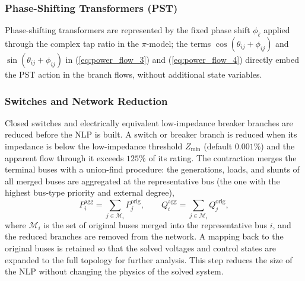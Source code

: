 \documentclass[letterpaper,journal]{IEEEtran}
\begin{document}
\subsubsection{Phase-Shifting Transformers (PST)}
Phase-shifting transformers are represented by the fixed phase shift $\phi_\ell$ applied through the complex tap ratio in the
$\pi$-model; the terms $\cos(\theta_{ij}+\phi_{ij})$ and $\sin(\theta_{ij}+\phi_{ij})$ in
(\ref{eq:power_flow_3}) and (\ref{eq:power_flow_4}) directly embed the PST action in the branch flows, without additional state
variables. 
\subsubsection{Switches and Network Reduction}
Closed switches and electrically equivalent low-impedance breaker branches are reduced before the NLP is built. A switch or breaker
branch is reduced when its impedance is below the low-impedance threshold $Z_{\min}$ (default $0.001\%$) and the apparent flow through it exceeds
$125\%$ of its rating. The contraction merges the terminal buses with a union-find procedure: the generations, loads, and shunts of
all merged buses are aggregated at the representative bus (the one with the highest bus-type priority and external degree),
\begin{equation}
	\label{eq:switch_aggregation}
	P^{\mathrm{agg}}_i = \sum_{j \in \mathcal{M}_i} P^{\mathrm{orig}}_j, \qquad
	Q^{\mathrm{agg}}_i = \sum_{j \in \mathcal{M}_i} Q^{\mathrm{orig}}_j,
\end{equation}
where $\mathcal{M}_i$ is the set of original buses merged into the representative bus $i$, and the reduced branches are removed
from the network. A mapping back to the original buses is retained so that the solved voltages and control states are expanded to the
full topology for further analysis. This step reduces the size of the NLP without changing the physics of the solved system.
\end{document}

